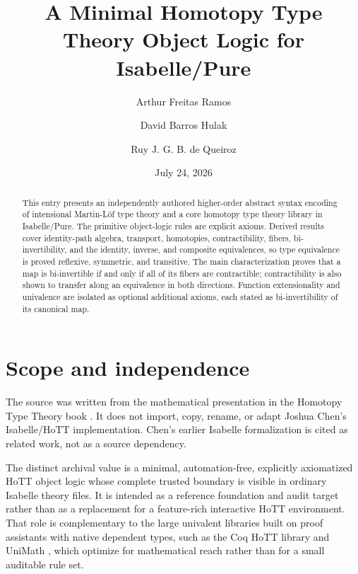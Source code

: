 \documentclass[11pt,a4paper]{article}
\begin{document}
\title{A Minimal Homotopy Type Theory Object Logic for Isabelle/Pure}
\author{Arthur Freitas Ramos \and David Barros Hulak \and
  Ruy J. G. B. de Queiroz}
\date{July 24, 2026}
\maketitle

\begin{abstract}
This entry presents an independently authored higher-order abstract syntax
encoding of intensional Martin-L\"of type theory
\cite{MartinLof1984,NordstromPeterssonSmith1990} and a
core homotopy type theory library \cite{HoTTBook2013} in Isabelle/Pure. The
primitive object-logic rules are explicit axioms. Derived results cover
identity-path algebra, transport, homotopies, contractibility, fibers,
bi-invertibility, and the identity, inverse, and composite equivalences, so
type equivalence is proved reflexive, symmetric, and transitive. The main
characterization proves that a map is bi-invertible if and only if all of
its fibers are contractible; contractibility is also shown to transfer along an
equivalence in both directions.
Function extensionality and univalence are isolated as optional additional
axioms, each stated as bi-invertibility of its canonical map.
\end{abstract}

\tableofcontents

\section{Scope and independence}

The source was written from the mathematical presentation in the Homotopy Type
Theory book \cite{HoTTBook2013}. It does not import, copy, rename, or adapt
Joshua Chen's Isabelle/HoTT implementation. Chen's earlier Isabelle
formalization \cite{Chen2021} is cited as related work, not as a source
dependency.

The distinct archival value is a minimal, automation-free, explicitly
axiomatized HoTT object logic whose complete trusted boundary is visible in
ordinary Isabelle theory files. It is intended as a reference foundation and
audit target rather than as a replacement for a feature-rich interactive HoTT
environment. That role is complementary to the large univalent libraries built
on proof assistants with native dependent types, such as the Coq HoTT library
\cite{BauerEtAl2017} and UniMath \cite{Voevodsky2015}, which optimize for
mathematical reach rather than for a small auditable rule set.
\end{document}
